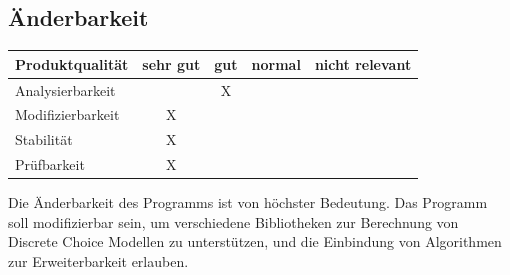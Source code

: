 \documentclass{article}
\begin{document}
\subsection{Änderbarkeit}
\begin{table}[H]
\centering
\begin{tabular}{lcccc}
\hline
\textbf{Produktqualität} & sehr gut & gut & normal & nicht relevant \\ \hline
Analysierbarkeit         &          & X   &        &                \\
Modifizierbarkeit        & X        &     &        &                \\
Stabilität               & X        &     &        &                \\
Prüfbarkeit              & X        &     &        &                \\
\end{tabular}
\end{table}
Die Änderbarkeit des Programms ist von höchster Bedeutung. Das Programm soll modifizierbar sein, um verschiedene Bibliotheken zur Berechnung von Discrete Choice Modellen zu unterstützen, und die Einbindung von Algorithmen zur Erweiterbarkeit erlauben.

\clearpage

\glsaddall
\printglossary[%
]
\end{document}
